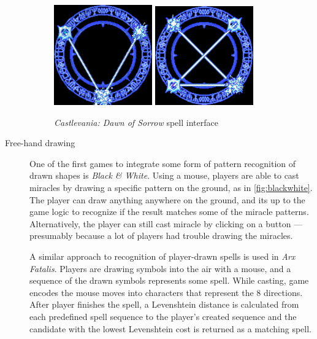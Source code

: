 \begin{description}
\begin{figure}
\centering
\includegraphics[width=.3\linewidth]{ext/castlevania.png}
\quad
\includegraphics[width=.3\linewidth]{ext/castlevania2.png}
\caption{\emph{Castlevania: Dawn of Sorrow} spell interface }
\label{fig:castlevania} %
\end{figure}

\item[Free-hand drawing]
One of the first games to integrate some form of pattern recognition of drawn shapes is \emph{Black \& White}. Using a mouse, players are able to cast miracles by drawing a specific pattern on the ground, as in \cref{fig:blackwhite}. The player can draw anything anywhere on the ground, and its up to the game logic to recognize if the result matches some of the miracle patterns. Alternatively, the player can still cast miracle by clicking on a button --- presumably because a lot of players had trouble drawing the miracles.

A similar approach to recognition of player-drawn spells is used in \emph{Arx Fatalis}. Players are drawing symbols into the air with a mouse, and a sequence of the drawn symbols represents some spell. While casting, game encodes the mouse moves into characters that represent the 8 directions. After player finishes the spell, a Levenshtein distance is calculated from each predefined spell sequence to the player's created sequence and the candidate with the lowest Levenshtein cost is returned as a matching spell.


\end{description}
